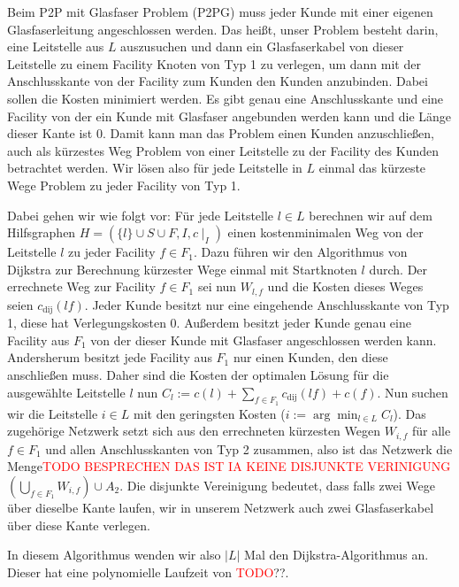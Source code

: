 \documentclass[11pt,a4paper]{article}
\newcommand{\TODO}{\textcolor{red}{TODO}}
\theoremstyle{my_th_style1}
\begin{document}
Beim P2P mit Glasfaser Problem (P2PG) muss jeder Kunde mit einer eigenen Glasfaserleitung angeschlossen werden.
Das heißt, unser Problem besteht darin, eine Leitstelle aus $L$ auszusuchen und dann ein Glasfaserkabel von dieser Leitstelle zu einem Facility Knoten von Typ 1 zu verlegen, um dann mit der Anschlusskante von der Facility zum Kunden den Kunden anzubinden.
Dabei sollen die Kosten minimiert werden.
Es gibt genau eine Anschlusskante und eine Facility von der ein Kunde mit Glasfaser angebunden werden kann und die Länge dieser Kante ist 0.
Damit kann man das Problem einen Kunden anzuschließen, auch als kürzestes Weg Problem von einer Leitstelle zu der Facility des Kunden betrachtet werden.
Wir lösen also für jede Leitstelle in $L$ einmal das kürzeste Wege Problem zu jeder Facility von Typ 1.

Dabei gehen wir wie folgt vor:
Für jede Leitstelle $ l \in L$ berechnen wir auf dem Hilfsgraphen $H=(\{l\} \cup S \cup F , I,c\mid_I)$ einen kostenminimalen Weg von der Leitstelle $l$ zu jeder Facility $f \in F_1$. Dazu führen wir den Algorithmus von Dijkstra zur Berechnung k\"urzester Wege einmal mit Startknoten $l$ durch.
Der errechnete Weg zur Facility \( f \in F_1\) sei nun $W_{l,f}$ und die Kosten dieses Weges seien $c_{\text{dij}}(lf)$. 
Jeder Kunde besitzt nur eine eingehende Anschlusskante von Typ 1, diese hat Verlegungskosten 0. 
Außerdem besitzt jeder Kunde genau eine Facility aus $F_1$ von der dieser Kunde mit Glasfaser angeschlossen werden kann. 
Andersherum besitzt jede Facility aus $F_1$ nur einen Kunden, den diese anschließen muss. 
Daher sind die Kosten der optimalen Lösung für die ausgewählte Leitstelle $l$ nun $C_l:=c(l) + \displaystyle\sum_{f \in F_1} c_{\text{dij}}(lf) + c(f)$. 
Nun suchen wir die Leitstelle $i \in L$ mit den geringsten Kosten ($i:=\arg \displaystyle\min_{l \in L} C_l$). Das zugehörige Netzwerk setzt sich aus den errechneten kürzesten Wegen $W_{i,f}$ für alle $f \in F_1$ und allen Anschlusskanten von Typ 2 zusammen, also ist das Netzwerk die Menge\textcolor{red}{TODO BESPRECHEN DAS IST IA KEINE DISJUNKTE VERINIGUNG} $(\bigcup_{f \in F_1 }W_{i,f}) \cup A_2 $. Die disjunkte Vereinigung bedeutet, dass falls zwei Wege über dieselbe Kante laufen, wir in unserem Netzwerk auch zwei Glasfaserkabel über diese Kante verlegen.

In diesem Algorithmus wenden wir also $|L|$ Mal den Dijkstra-Algorithmus an.
Dieser hat eine polynomielle Laufzeit von \TODO??. 
\end{document}
